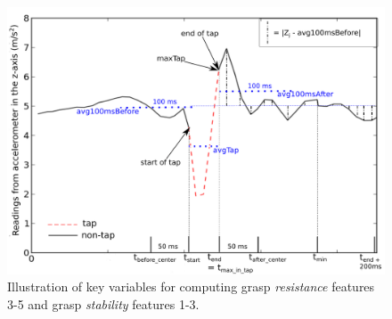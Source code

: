 \begin{figure}[tb]
\includegraphics[width=0.96\linewidth]{plots/drawingStabilityFeaturesNewNewSignal.pdf}
\caption[]{Illustration of key variables for computing grasp {\em resistance} features 3-5 and grasp {\em stability} features 1-3.}
\label{fig:drawingStabilityFeatures}
\end{figure}

